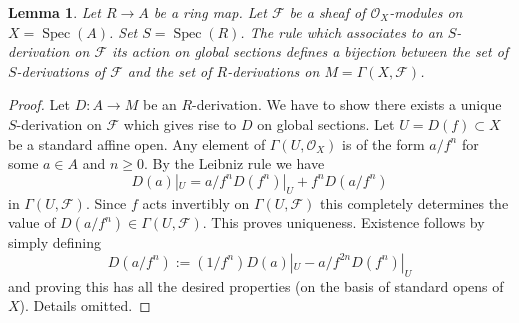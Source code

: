 \documentclass[10pt,a4paper]{amsart}
\theoremstyle{plain}
\newtheorem{lemma}[subsection]{Lemma}
\theoremstyle{definition}
\theoremstyle{remark}
\numberwithin{equation}{subsection}
\def\Spec{\mathop{\mathrm{Spec}}}
\begin{document}
\begin{lemma}
\label{lemma-affine-case-derivation}
Let $R \to A$ be a ring map. Let $\mathcal{F}$
be a sheaf of $\mathcal{O}_X$-modules
on $X = \Spec(A)$. Set $S = \Spec(R)$.
The rule which associates to an $S$-derivation on $\mathcal{F}$
its action on global sections defines a bijection between
the set of $S$-derivations of $\mathcal{F}$ and the set of
$R$-derivations on $M = \Gamma(X, \mathcal{F})$.
\end{lemma}

\begin{proof}
Let $D : A \to M$ be an $R$-derivation. We have to show there exists
a unique $S$-derivation on $\mathcal{F}$ which gives rise to
$D$ on global sections. Let $U = D(f) \subset X$ be a standard affine open.
Any element of $\Gamma(U, \mathcal{O}_X)$ is of the form
$a/f^n$ for some $a \in A$ and $n \geq 0$. By the Leibniz rule
we have
$$
D(a)|_U = a/f^n D(f^n)|_U + f^n D(a/f^n)
$$
in $\Gamma(U, \mathcal{F})$. Since $f$ acts invertibly
on $\Gamma(U, \mathcal{F})$ this completely determines
the value of $D(a/f^n) \in \Gamma(U, \mathcal{F})$.
This proves uniqueness. Existence follows by simply defining
$$
D(a/f^n) := (1/f^n) D(a)|_U - a/f^{2n} D(f^n)|_U
$$
and proving this has all the desired properties (on the basis
of standard opens of $X$). Details omitted.
\end{proof}
\end{document}
